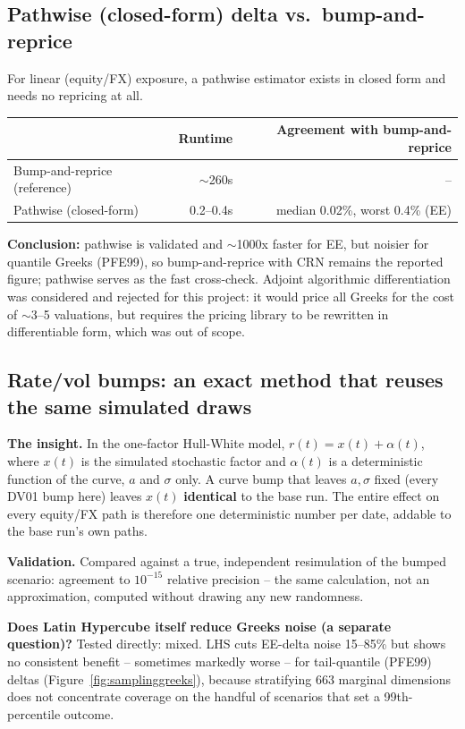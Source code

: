 \documentclass[10pt,letterpaper]{article}
\begin{document}
\subsection{Pathwise (closed-form) delta vs.\ bump-and-reprice}
For linear (equity/FX) exposure, a pathwise estimator exists in closed form and needs no repricing at all.
\begin{center}\small
\begin{tabular}{lrr}
\toprule
& \textbf{Runtime} & \textbf{Agreement with bump-and-reprice} \\
\midrule
Bump-and-reprice (reference) & $\sim$260s & -- \\
Pathwise (closed-form) & 0.2--0.4s & median 0.02\%, worst 0.4\% (EE) \\
\bottomrule
\end{tabular}
\end{center}
\textbf{Conclusion:} pathwise is validated and $\sim$1000x faster for EE, but noisier for quantile Greeks (PFE99), so bump-and-reprice with CRN remains the reported figure; pathwise serves as the fast cross-check. Adjoint algorithmic differentiation was considered and rejected for this project: it would price all Greeks for the cost of $\sim$3--5 valuations, but requires the pricing library to be rewritten in differentiable form, which was out of scope.

\subsection{Rate/vol bumps: an exact method that reuses the same simulated draws}\label{sec:lhs-sampling-greeks}
\textbf{The insight.} In the one-factor Hull-White model, $r(t)=x(t)+\alpha(t)$, where $x(t)$ is the simulated stochastic factor and $\alpha(t)$ is a deterministic function of the curve, $a$ and $\sigma$ only. A curve bump that leaves $a,\sigma$ fixed (every DV01 bump here) leaves $x(t)$ \textbf{identical} to the base run. The entire effect on every equity/FX path is therefore one deterministic number per date, addable to the base run's own paths.

\textbf{Validation.} Compared against a true, independent resimulation of the bumped scenario: agreement to $10^{-15}$ relative precision -- the same calculation, not an approximation, computed without drawing any new randomness.

\textbf{Does Latin Hypercube itself reduce Greeks noise (a separate question)?} Tested directly: mixed. LHS cuts EE-delta noise 15--85\% but shows no consistent benefit -- sometimes markedly worse -- for tail-quantile (PFE99) deltas (Figure~\ref{fig:samplinggreeks}), because stratifying 663 marginal dimensions does not concentrate coverage on the handful of scenarios that set a 99th-percentile outcome.
\end{document}
